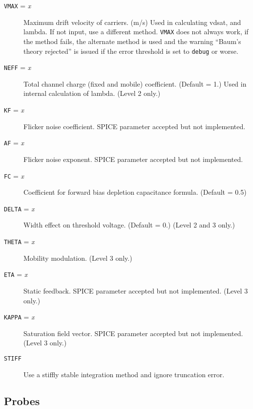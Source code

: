\begin{description}
\item[{\tt VMAX} = {\it x}] Maximum drift velocity of carriers. (m/s)
Used in calculating vdsat, and lambda.  If not input, use a different
method.  {\tt VMAX} does not always work, if the method fails, the alternate
method is used and the warning ``Baum's theory rejected'' is issued if the
error threshold is set to {\tt debug} or worse.

\item[{\tt NEFF} = {\it x}] Total channel charge (fixed and mobile)
coefficient. (Default = 1.)  Used in internal calculation of lambda.
(Level 2 only.)

\item[{\tt KF} = {\it x}] Flicker noise coefficient.  SPICE parameter
accepted but not implemented.

\item[{\tt AF} = {\it x}] Flicker noise exponent.  SPICE parameter accepted
but not implemented.

\item[{\tt FC} = {\it x}] Coefficient for forward bias depletion capacitance
formula. (Default = 0.5)

\item[{\tt DELTA} = {\it x}] Width effect on threshold voltage.
(Default = 0.)  (Level 2 and 3 only.)

\item[{\tt THETA} = {\it x}] Mobility modulation.  (Level 3 only.)

\item[{\tt ETA} = {\it x}] Static feedback.  SPICE parameter accepted but
not implemented.  (Level 3 only.)

\item[{\tt KAPPA} = {\it x}] Saturation field vector.  SPICE parameter
accepted but not implemented.   (Level 3 only.)

\item[{\tt STIFF}] Use a stiffly stable integration method and
ignore truncation error.

\end{description}
\subsection{Probes}

